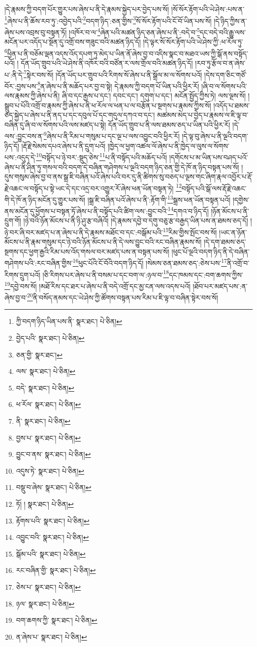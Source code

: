།དེ་རྣམས་ཀྱི་བདག་པོར་གྱུར་པས་ཞེས་པ་ནི་དེ་རྣམས་སྐྱེད་པར་བྱེད་པས་སོ། །སོ་སོར་རྟོག་པའི་ཡེ་ཤེས་:པས་ན་\footnote{ཀྱི་བདག་ཉིད་ཡིན་པས་ནི་  སྣར་ཐང་།  པེ་ཅིན། }ཞེས་པ་ནི་ཆོས་རབ་ཏུ་:འབྱེད་པའི་\footnote{བྱེད་པའི་  སྣར་ཐང་།  པེ་ཅིན། }བདག་ཉིད་:ཅན་གྱིས་\footnote{ཅན་གྱི་  སྣར་ཐང་། }སོ་སོར་རྟོག་པའི་ངོ་བོ་ཡིན་པས་སོ། །དེ་ཉིད་ཀྱིས་ན་ཞེས་པས་འབྲས་བུ་བསྟན་ཏོ། །འཁོར་བ་ལ་\footnote{ལས་  སྣར་ཐང་།  པེ་ཅིན། }ཞེན་པའི་མཚན་ཉིད་ཅན་ཞེས་པ་ནི་:བདེ་བ་\footnote{བདེ་  སྣར་ཐང་།  པེ་ཅིན། }དང་བདེ་བའི་རྒྱུ་ལས་མངོན་པར་འདོད་པ་སྔོན་དུ་འགྲོ་བས་གཟུང་བའི་མཚན་ཉིད་དོ། །དེ་ལྟར་སོ་སོར་རྟོག་པའི་ཡེ་ཤེས་ཀྱི་:ཕ་རོལ་ཏུ་\footnote{ཕ་རོལ་  སྣར་ཐང་།  པེ་ཅིན། }ཕྱིན་པ་ནི་བཅོམ་ལྡན་འདས་འོད་དཔག་ཏུ་མེད་པ་ཡིན་ནོ་ཞེས་བྱ་བ་འདིས་སྣང་བ་མཐའ་ཡས་ཀྱི་སྒོ་ནས་བསྟོད་པའོ། །
དོན་ཡོད་གྲུབ་པའི་ཡེ་ཤེས་ནི་འཁོར་བའི་བཙོན་ར་ལས་གྲོལ་བའི་མཚན་ཉིད་དོ། །རབ་ཏུ་རྩོལ་བ་ན་ཞེས་པ་:ནི་དེ་\footnote{ནི་  སྣར་ཐང་།  པེ་ཅིན། }སྟེར་བས་སོ། །དོན་ཡོད་པར་གྲུབ་པའི་རིགས་སོ་ཞེས་པ་ནི་སྒྲོལ་མ་ལ་སོགས་པའོ། །དེས་དག་ཅིང་གཙོ་བོར་:བྱས་པས་\footnote{བྱས་པ་  སྣར་ཐང་།  པེ་ཅིན། }ན་ཞེས་པ་ནི་མཆོད་པར་བྱ་བ་སྟེ། དེ་རྣམས་ཀྱི་བདག་པོ་ཡིན་པའི་ཕྱིར་རོ། །ཞི་བ་ལ་སོགས་པའི་ལས་རྣམས་ཀྱི་ཞེས་པ་ནི། ཞི་བ་དང་རྒྱས་པ་དང་། དབང་དང་། དགུག་པ་དང་། མངོན་སྤྱོད་ཀྱིས་ཏེ། ལས་ལྔས་སོ། །སྒྲུབ་པ་པོའི་འགྲོ་བ་རྣམས་ཀྱི་ཞེས་པ་ནི་ཕ་རོལ་ལ་ཕན་པ་ལ་བརྩོན་པ་སྔགས་པ་རྣམས་ཀྱིས་སོ། །འདོད་པ་ཐམས་ཅད་སྐྱེད་པ་ཞེས་པ་ནི་ནད་པ་དང་དབུལ་པོ་དང་གདུལ་དཀའ་བ་དང་། མཚམས་མེད་པ་བྱེད་པ་རྣམས་ལ་ཇི་ལྟ་བ་བཞིན་དུ་ཞི་བ་ལ་སོགས་པའི་ལས་མཛད་པ་སྟེ། དོན་ཡོད་གྲུབ་པ་ནི་ལས་ཐམས་ཅད་པ་ཡིན་པའི་ཕྱིར་རོ། །དེ་ལས་:བྱུང་བས་ན་\footnote{བྱུང་བ་ནས་  སྣར་ཐང་།  པེ་ཅིན། }ཞེས་པ་ནི་རིམ་པ་གསུམ་པ་དང་ལྔ་པ་ལས་འབྱུང་བའི་ཕྱིར་རོ། །དེ་ལྟ་བུ་ཞེས་པ་ནི་ལྔའི་བདག་ཉིད་དོ། །རྡོ་རྗེ་སེམས་དཔའ་ཞེས་པ་ནི་དྲུག་པའོ། །ཁྱེད་ལ་ཕྱག་འཚལ་ལོ་ཞེས་པ་ནི་ཁྱེད་ལ་ལུས་ལ་སོགས་པས་:འདུད་དེ་\footnote{འདུས་ཏེ་  སྣར་ཐང་།  པེ་ཅིན། }བསྟོད་པ་ཉེ་བར་:སྡུད་ཅེས་\footnote{བསྡུ་བ་ཞེས་  སྣར་ཐང་།  པེ་ཅིན། }པ་ནི་བསྟོད་པའི་མཆོད་པའོ། །དགོངས་པ་མ་ཡིན་པས་བཤད་པའོ་ཞེས་པ་ནི་ཤིན་ཏུ་གསལ་བའི་བདག་དེ་བཞིན་གཤེགས་པ་ལྔའི་བདག་ཉིད་ཅན་གྱི་དེ་ཁོ་ན་ཉིད་བསྟན་པས་སོ། །དུས་གསུམ་ཞེས་བྱ་བ་ནས་སྒྲ་ཇི་བཞིན་པའོ་ཞེས་པའི་བར་དུ་ནི་ཚིགས་སུ་བཅད་པ་ལྔས་གང་ཞིག་རྣལ་འབྱོར་པ་རྡོ་རྗེ་འཆང་ལ་བསྟོད་པ་སྟེ་ཡང་དེ་དང་འདྲ་བར་འགྱུར་རོ་ཞེས་ཕན་ཡོན་བསྟན་ཏེ། \footnote{ཏོ། །   སྣར་ཐང་།  པེ་ཅིན། }བསྟོད་པའི་སྒོ་ལས་རྡོ་རྗེ་འཆང་གི་དེ་ཁོ་ན་ཉིད་མངོན་དུ་གྱུར་པས་སོ། །སྒྲ་ཇི་བཞིན་པའོ་ཞེས་པ་ནི་:རྟོག་གི་\footnote{རྟོགས་པའི་  སྣར་ཐང་།  པེ་ཅིན། }སྒྲས་ཕན་ཡོན་བསྟན་པའོ། །དགྱེས་ནས་མངོན་དུ་ཕྱོགས་པ་བསྟན་ཏོ་ཞེས་པ་ནི་བསྟོད་པའི་ཚིག་ལས་:བྱུང་བའི་\footnote{འབྱུང་བའི་  སྣར་ཐང་།  པེ་ཅིན། }དགའ་བ་ཉིད་དོ། །ཉོན་མོངས་པ་ནི་དྲུག་གོ། །ཉེ་བའི་ཉོན་མོངས་པ་ནི་ཉི་ཤུ་རྩ་བཞིའོ། །དེ་རྣམས་དབྱེ་བ་དགུ་བཅུ་རྩ་བརྒྱད་ཡིན་པས་ན་ཐམས་ཅད་དོ། །ཉེ་བར་ཞི་བར་མཛད་པ་ན་ཞེས་པ་ནི་དེ་རྣམས་མཐོང་བ་དང་:བསྒོམ་པའི་\footnote{སྒོམ་པའི་  སྣར་ཐང་།  པེ་ཅིན། }རིམ་གྱིས་སྤོང་བས་སོ། །ཡང་ན་ཉོན་མོངས་པ་ནི་རྣམ་གསུམ་དང་ཉེ་བའི་ཉོན་མོངས་པ་ནི་དེ་ལས་བྱུང་བའི་རང་བཞིན་རྣམས་སོ། །དེ་དག་ཐམས་ཅད་སྔགས་དང་ཕྱག་རྒྱའི་རིམ་པས་འོད་གསལ་བར་མཛད་པས་ན་བསྟན་པས་སོ། །ཕུང་པོ་ལྔའི་བདག་ཉིད་ནི་དེ་བཞིན་གཤེགས་པའི་:རང་བཞིན་གྱིས་\footnote{རང་བཞིན་གྱི་  སྣར་ཐང་།  པེ་ཅིན། }ཕུང་པོའི་ངོ་བོའི་བདག་ཉིད་དོ། །སེམས་ཅན་ཐམས་ཅད་:ཅེས་པས་\footnote{ཅེས་པ་  སྣར་ཐང་།  པེ་ཅིན། }ནི་འགྲོ་བ་རིགས་དྲུག་པའོ། །ཅི་རིགས་པར་ཞེས་པ་ནི་བསམ་པ་དང་བག་ལ་:ཉལ་བ་\footnote{ཉལ་  སྣར་ཐང་།  པེ་ཅིན། }དང་ཁམས་དང་:བག་ཆགས་ཀྱིས་\footnote{བག་ཆགས་ཀྱི་  སྣར་ཐང་།  པེ་ཅིན། }དབྱེ་བས་སོ། །མཐོ་རིས་དང་ཐར་པ་ཞེས་པ་ནི་བདེ་འགྲོ་དང་མྱ་ངན་ལས་འདས་པའོ། །ཐོབ་པར་མཛད་པས་:ན་ཞེས་བྱ་བ་\footnote{ན་ཞེས་པ་  སྣར་ཐང་།  པེ་ཅིན། }ནི་བསོད་ནམས་དང་ཡེ་ཤེས་ཀྱི་ཚོགས་བསྟན་པས་རིམ་པ་ཇི་ལྟ་བ་བཞིན་སྟེར་བས་སོ། 